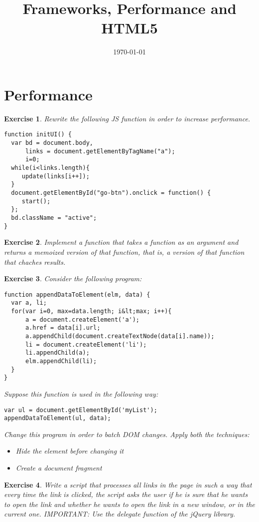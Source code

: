 \documentclass{article}
\title{Frameworks, Performance and HTML5}
\date{\today}
\newtheorem{ex}{Exercise}[section]
\begin{document}
\section{Performance}

\begin{ex}
Rewrite the following JS function in order to increase performance. 
\begin{verbatim}
function initUI() { 
  var bd = document.body, 
      links = document.getElementByTagName("a"); 
      i=0; 
  while(i<links.length){
     update(links[i++]); 
  }
  document.getElementById("go-btn").onclick = function() { 
     start(); 
  };
  bd.className = "active";  
}
\end{verbatim}
\end{ex}

\begin{ex}
Implement a function that takes a function as an argument and 
returns a memoized version of that function, that is, a 
version of that function that chaches results.  
\end{ex}

\begin{ex}
Consider the following program:
\begin{verbatim}
function appendDataToElement(elm, data) { 
  var a, li; 
  for(var i=0, max=data.length; i&lt;max; i++){ 
      a = document.createElement('a'); 
	  a.href = data[i].url; 
	  a.appendChild(document.createTextNode(data[i].name)); 
	  li = document.createElement('li'); 
	  li.appendChild(a); 
	  elm.appendChild(li); 
  }
}  
\end{verbatim} 
Suppose this function is used in the following way: 
\begin{verbatim}
var ul = document.getElementById('myList'); 
appendDataToElement(ul, data);  
\end{verbatim}
Change this program in order to batch DOM changes. Apply both the techniques: 
\begin{itemize}
   \item Hide the element before changing it
   \item Create a document fragment
\end{itemize}
\end{ex}

\begin{ex}
Write a script that processes all links in the page in such a way that 
every time the link is clicked, the script asks the user if he is sure 
that he wants to open the link and whether he wants to open the link 
in a new window, or in the current one. IMPORTANT: Use the delegate 
function of the jQuery library. 
\end{ex}
\end{document}
